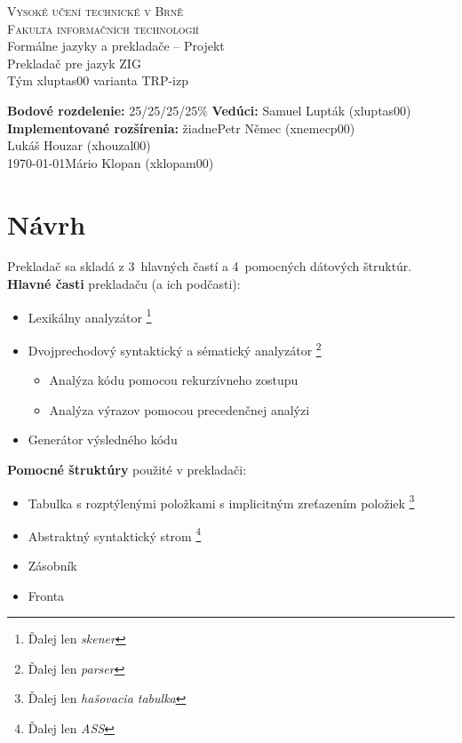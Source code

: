 \documentclass[Slovak, a4paper, 12pt]{article}
\begin{document}
	\begin{titlepage}
		
		\begin{center}
			\textsc{{\LARGE Vysoké učení technické v Brně \\[0.5em]}  {\LARGE Fakulta informačních technologií}} \\
			{\Large Formálne jazyky a prekladače  -- Projekt \\[0.6em]}
			{\huge Prekladač pre jazyk ZIG} \\[0.6em]
			{\large Tým xluptas00 varianta TRP-izp}
			
		\end{center}
		\begin{flushright}
			{ \textbf{Bodové rozdelenie:} 25/25/25/25\% \hfill \textbf{Vedúci: }Samuel Lupták (xluptas00)} \\
			{ \textbf{Implementované rozšírenia:} žiadne\hfill  Petr Němec (xnemecp00)} \\
			{ \hfill  Lukáš Houzar (xhouzal00)} \\
			{\today \hfill Mário Klopan (xklopam00)}
		\end{flushright}
		
	\end{titlepage}
	
	\section{Návrh}
	\noindent Prekladač sa skladá z 3~hlavných častí a 4~pomocných dátových štruktúr.\\
	\textbf{Hlavné časti} prekladaču (a ich podčasti):
	\begin{itemize}
		\item Lexikálny analyzátor \footnote[1]{Ďalej len \textit{skener}}
		\item Dvojprechodový syntaktický a sématický analyzátor \footnote[2]{Ďalej len \textit{parser}}
		\begin{itemize} 
			\item Analýza kódu pomocou rekurzívneho zostupu
			\item Analýza výrazov pomocou precedenčnej analýzi 
		\end{itemize}
		\item Generátor výsledného kódu
	\end{itemize}
	
	\noindent\textbf{Pomocné štruktúry} použité v prekladači:
		\begin{itemize}
		\item  Tabulka s rozptýlenými položkami s implicitným zreťazením položiek \footnote[3]{Ďalej len \textit{hašovacia tabulka}}
		\item Abstraktný syntaktický strom \footnote[4]{Ďalej len \textit{ASS}}
		\item Zásobník
		\item Fronta
	\end{itemize}
	
\end{document}
